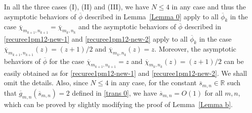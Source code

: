 \documentclass[12pt]{amsart}
\numberwithin{equation}{section}
\begin{document}
In all the three cases (I), (II) and (III), we have $N\leq 4$ in any case and thus the asymptotic behaviors of $\overline{\phi}$ described in Lemma~\ref{Lemma 0} apply to all $\overline{\phi}_k$ in the case $\overline{\chi}_{m_{k+1},n_{k+1}}=\overline{\chi}_{m_k,n_k}$ and the asymptotic behaviors of $\overline{\phi}$ described in \eqref{recuree1pm12-new-1} and \eqref{recuree1pm12-new-2} apply to all $\overline{\phi}_k$ in the case $\overline{\chi}_{m_{k+1},n_{k+1}}(z)=(z+1)/2$ and $\overline{\chi}_{m_k,n_k}(z)=z$. Moreover, the asymptotic behaviors of $\overline{\phi}$ for the case $\overline{\chi}_{m_{k+1},n_{k+1}}=z$ and $\overline{\chi}_{m_k,n_k}(z)=(z+1)/2$ can be easily obtained as for \eqref{recuree1pm12-new-1} and \eqref{recuree1pm12-new-2}. We shall omit the details. Also, since $N\leq 4$ in any case, for the constant $\overline{s}_{m,n}\in \mathbb{R}$ such that $\overline{g}_{m,n}(\overline{s}_{m,n})=2$ defined in \eqref{trans 0}, we have $\overline{s}_{m,n}=O(1)$ for all $m,n$, which can be proved by slightly modifying the proof of Lemma~\ref{Lemma b}.
\end{document}
